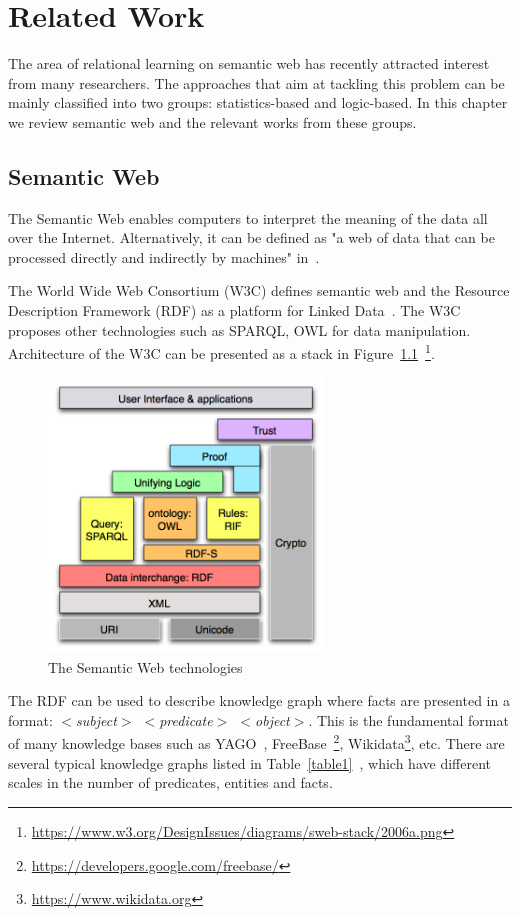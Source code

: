 \chapter{Related Work}

The area of relational learning on semantic web has recently attracted interest from many researchers. The approaches that aim at tackling this problem can be mainly classified into two groups: statistics-based and logic-based. In this chapter we review semantic web and the relevant works from these groups.

\section{Semantic Web}

The Semantic Web enables computers to interpret the meaning of the data all over the Internet. Alternatively, it can be defined as "a web of data that can be processed directly and indirectly by machines" in~\cite{ref26}.

The World Wide Web Consortium (W3C) defines semantic web and the Resource Description Framework (RDF) as a platform for Linked Data~\cite{ref26}. The W3C proposes other technologies such as SPARQL, OWL for data manipulation. Architecture of the W3C can be presented as a stack in Figure~\ref{fig1}~\footnote{\url{https://www.w3.org/DesignIssues/diagrams/sweb-stack/2006a.png}}.

\begin{figure}
\centering
\includegraphics[width=0.65\textwidth]{semantic-web.png}
\caption{The Semantic Web technologies}
\label{fig1}
\end{figure}

The RDF can be used to describe knowledge graph where facts are presented in a format: \textit{$<$subject$>$ $<$predicate$>$ $<$object$>$}. This is the fundamental format of many knowledge bases such as YAGO~\cite{ref28}, FreeBase~\footnote{\url{https://developers.google.com/freebase/}}, Wikidata\footnote{\url{https://www.wikidata.org}}, etc. There are several typical knowledge 
graphs listed in Table~\ref{table1}~\cite{ref27}, which have different scales in the number of predicates, entities and facts.

